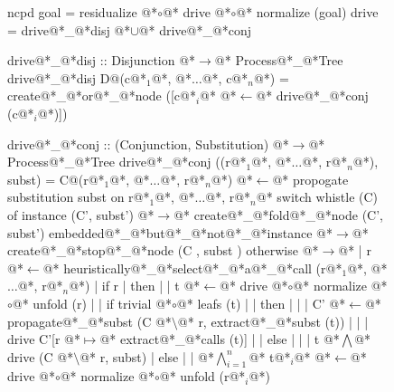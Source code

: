 \documentclass[12pt,a4paper]{report}
\begin{document}
\thispagestyle{empty}
\begin{figure}[h]
\begin{PseudoCode}[moredelim={[is][stringstyle]{@@}{@@}},
  moredelim={[is][\color{dkgreen}\bfseries]{@!}{@!}},
  moredelim={[is][\color{red}\bfseries]{!!}{!!}}]
ncpd goal = residualize @*$\circ$@* drive @*$\circ$@* normalize (goal)
drive     = drive@*\_@*disj @*$\cup$@* drive@*\_@*conj

drive@*\_@*disj :: Disjunction @*$\to$@* Process@*\_@*Tree
drive@*\_@*disj D@(c@*$_1$@*, @*$\dots$@*, c@*$_n$@*) =
  create@*\_@*or@*\_@*node ([c@*$_i$@* @*$\leftarrow$@* drive@*\_@*conj (c@*$_i$@*)])

drive@*\_@*conj :: (Conjunction, Substitution) @*$\to$@* Process@*\_@*Tree
drive@*\_@*conj ((r@*$_1$@*, @*$\dots$@*, r@*$_n$@*), subst) =
  C@(r@*$_1$@*, @*$\dots$@*, r@*$_n$@*) @*$\leftarrow$@* propogate substitution subst on r@*$_1$@*, @*$\dots$@*, r@*$_n$@*
  switch whistle (C) of
    instance (C', subst')      @*$\to$@* create@*\_@*fold@*\_@*node (C', subst')
    embedded@*\_@*but@*\_@*not@*\_@*instance @*$\to$@* create@*\_@*stop@*\_@*node (C , subst )
    otherwise @*$\to$@*
    | r @*$\leftarrow$@* heuristically@*\_@*select@*\_@*a@*\_@*call (r@*$_1$@*, @*$\dots$@*, r@*$_n$@*)
    | if r
    | then
    | | t @*$\leftarrow$@* drive @*$\circ$@* normalize @*$\circ$@* unfold (r)
    | | if trivial @*$\circ$@* leafs (t)
    | | then
    | | | C' @*$\leftarrow$@* propagate@*\_@*subst (C @*$\setminus$@* r, extract@*\_@*subst (t))
    | | | drive C'[r @*$\mapsto$@* extract@*\_@*calls (t)]
    | | else
    | | | t @*$\bigwedge$@* drive (C @*$\setminus$@* r, subst)
    | else
    | | @*$\bigwedge_{i=1}^n$@* t@*$_i$@* @*$\leftarrow$@* drive @*$\circ$@* normalize @*$\circ$@* unfold (r@*$_i$@*)
\end{PseudoCode}
\end{figure}
\end{document}
